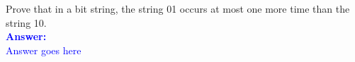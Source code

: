 \item{}
Prove that in a bit string, the string 01 occurs at most one more time than the
string 10.\\[12pt]
\ifanswers
\textcolor{blue}{
\textbf{Answer:}\\[6pt]
Answer goes here
}
\newpage
\fi
